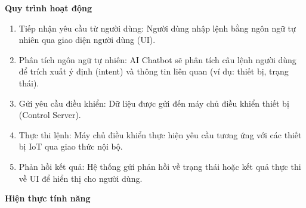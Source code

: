 \textbf{Quy trình hoạt động}
\begin{enumerate}
    \item Tiếp nhận yêu cầu từ người dùng: Người dùng nhập lệnh bằng ngôn ngữ tự nhiên qua giao diện người dùng (UI).
    \item Phân tích ngôn ngữ tự nhiên: AI Chatbot sẽ phân tích câu lệnh người dùng để trích xuất ý định (intent) và thông tin liên quan (ví dụ: thiết bị, trạng thái).
    \item Gửi yêu cầu điều khiển: Dữ liệu được gửi đến máy chủ điều khiển thiết bị (Control Server).
    \item Thực thi lệnh: Máy chủ điều khiển thực hiện yêu cầu tương ứng với các thiết bị IoT qua giao thức nội bộ.
    \item Phản hồi kết quả: Hệ thống gửi phản hồi về trạng thái hoặc kết quả thực thi về UI để hiển thị cho người dùng.
\end{enumerate}

\textbf{Hiện thực tính năng}

